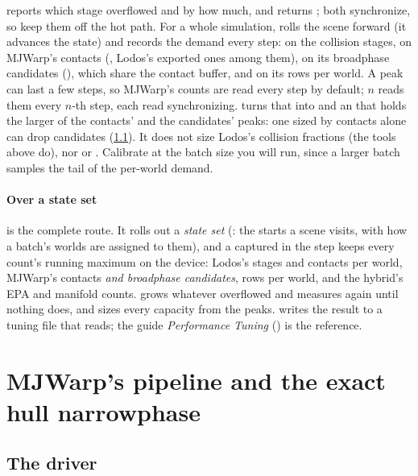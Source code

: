  reports which stage overflowed and by how much, and  returns ; both synchronize, so keep them off the hot path. For a whole simulation,  rolls the scene forward (it advances the state) and records the demand every step: on the collision stages, on MJWarp's contacts (, Lodos's exported ones among them), on its broadphase candidates (), which share the contact buffer, and on its rows per world. A peak can last a few steps, so MJWarp's counts are read every step by default; $n$ reads them every $n$-th step, each read synchronizing.  turns that into  and an  that holds the larger of the contacts' and the candidates' peaks: one sized by contacts alone can drop candidates (\cref{sec:driver}). It does not size Lodos's collision fractions (the tools above do), nor  or . Calibrate at the batch size you will run, since a larger batch samples the tail of the per-world demand.

\paragraph{Over a state set}  is the complete route. It rolls out a \emph{state set} (: the starts a scene visits, with how a batch's worlds are assigned to them), and a  captured in the step keeps every count's running maximum on the device: Lodos's stages and contacts per world, MJWarp's contacts \emph{and broadphase candidates}, rows per world, and the hybrid's EPA and manifold counts.  grows whatever overflowed and measures again until nothing does, and  sizes every capacity from the peaks.  writes the result to a tuning file that  reads; the guide \emph{Performance Tuning} () is the reference.

\section{MJWarp's pipeline and the exact hull narrowphase}\label{sec:mjw}

\subsection{The driver}\label{sec:driver}

